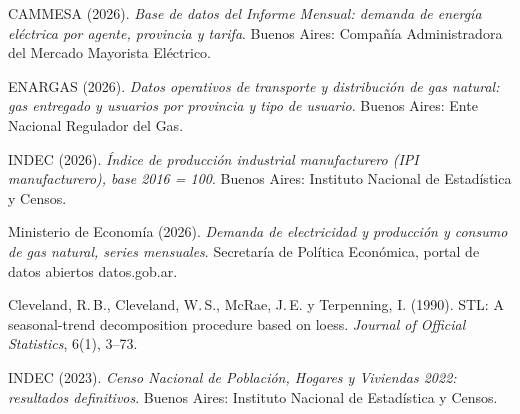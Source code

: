  CAMMESA (2026). \textit{Base de datos del Informe Mensual: demanda de energía eléctrica por agente, provincia y tarifa}. Buenos Aires: Compañía Administradora del Mercado Mayorista Eléctrico.

 ENARGAS (2026). \textit{Datos operativos de transporte y distribución de gas natural: gas entregado y usuarios por provincia y tipo de usuario}. Buenos Aires: Ente Nacional Regulador del Gas.

 INDEC (2026). \textit{Índice de producción industrial manufacturero (IPI manufacturero), base 2016 = 100}. Buenos Aires: Instituto Nacional de Estadística y Censos.

 Ministerio de Economía (2026). \textit{Demanda de electricidad y producción y consumo de gas natural, series mensuales}. Secretaría de Política Económica, portal de datos abiertos datos.gob.ar.

 Cleveland, R.\,B., Cleveland, W.\,S., McRae, J.\,E. y Terpenning, I. (1990). STL: A seasonal-trend decomposition procedure based on loess. \textit{Journal of Official Statistics}, 6(1), 3--73.

 INDEC (2023). \textit{Censo Nacional de Población, Hogares y Viviendas 2022: resultados definitivos}. Buenos Aires: Instituto Nacional de Estadística y Censos.
